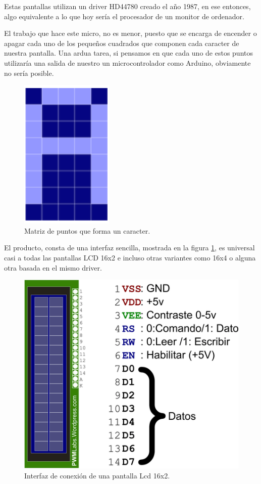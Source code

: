 \documentclass[letterpaper, 10pt]{report}
\begin{document}
Estas pantallas utilizan un driver HD44780 creado el año 1987, en ese entonces, algo equivalente a lo que hoy sería el procesador de un monitor de ordenador.

El trabajo que hace este micro, no es menor, puesto que se encarga de encender o apagar cada uno de los pequeños cuadrados que componen cada caracter de nuestra pantalla. Una ardua tarea, si pensamos en que cada uno de estos puntos utilizaría una salida de nuestro un microcontrolador como Arduino, obviamente no sería posible.

\begin{figure}[h]
\centering
\includegraphics[scale=0.4]{matriz.png}
\caption{Matriz de puntos que forma un caracter.}
\end{figure}

El producto, consta de una interfaz sencilla, mostrada en la figura \ref{interfaz}, es universal casi a todas las pantallas LCD 16x2 e incluso otras variantes como 16x4 o alguna otra basada en el mismo driver.

\begin{figure}[h]
\centering
\includegraphics[scale=2]{lcd_pines.png}
\caption{Interfaz de conexión de una pantalla Lcd 16x2.\label{interfaz}}
\end{figure}
\end{document}
